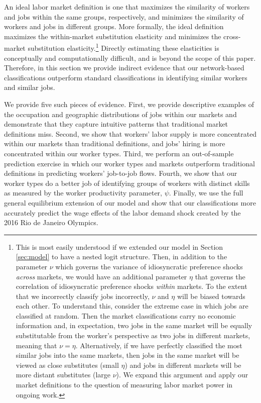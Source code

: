 \documentclass[12pt]{article}
\theoremstyle{definition}
\theoremstyle{plain}
\begin{document}
An ideal labor market definition is one that maximizes the similarity of workers and jobs within the same groups, respectively, and minimizes the similarity of workers and jobs in different groups. More formally, the ideal definition maximizes the within-market substitution elasticity and minimizes the cross-market substitution elasticity.\footnote{This is most easily understood if we extended our model in Section \ref{sec:model} to have a nested logit structure. Then, in addition to the parameter $\nu$ which governs the variance of idiosyncratic preference shocks \emph{across} markets, we would have an additional parameter $\eta$ that governs the correlation of idiosyncratic preference shocks \emph{within} markets. To the extent that we incorrectly classify jobs incorrectly, $\nu$ and $\eta$ will be biased towards each other. To understand this, consider the extreme case in which jobs are classified at random. Then the market classifications carry no economic information and, in expectation, two jobs in the same market will be equally substitutable from the worker's perspective as two jobs in different markets, meaning that $\nu=\eta$. Alternatively, if we have perfectly classified the most similar jobs into the same markets, then jobs in the same market will be viewed as close substitutes (small $\eta$) and jobs in different markets will be more distant substitutes (large $\nu$). We expand this argument and apply our market definitions to the question of measuring labor market power in ongoing work.} Directly estimating these elasticities is conceptually and computationally difficult, and is beyond the scope of this paper. Therefore, in this section we provide indirect evidence that our network-based classifications outperform standard classifications in identifying similar workers and similar jobs. 

We provide five such pieces of evidence. First, we provide descriptive examples of the occupation and geographic distributions of jobs within our markets and demonstrate that they capture intuitive patterns that traditional market definitions miss. Second, we show that workers' labor supply is more concentrated  within our markets than traditional definitions, and jobs' hiring is more concentrated within our worker types. Third, we perform an out-of-sample prediction exercise in which our worker types and markets outperform traditional definitions in predicting workers' job-to-job flows. Fourth, we show that our worker types do a better job of identifying groups of workers with distinct skills as measured by the worker productivity parameter, $\psi$. Finally, we use the full general equilibrium extension of our model and show that our classifications more accurately predict the wage effects of the labor demand shock created by the 2016 Rio de Janeiro Olympics. 
\end{document}
